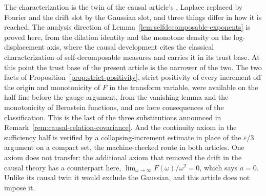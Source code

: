 \begin{remark}\label{rem:causal-relation-characterization}
The characterization is the twin of the causal article's ,
Laplace replaced by Fourier and the drift slot by the Gaussian slot, and three things differ
in how it is reached. The analysis direction of
Lemma~\ref{lem:selfdecomposable-exponents} is proved here, from the dilation identity and the
monotone density on the log-displacement axis, where the causal development cites the
classical characterization of self-decomposable \Levy{} measures and carries it in its trust
base. At this point the trust base of the present article is the narrower of the two. The two
facts of Proposition~\ref{prop:strict-positivity}, strict positivity of every increment off
the origin and monotonicity of $F$ in the transform variable, were available on the half-line
before the gauge argument, from the vanishing lemma and the monotonicity of Bernstein
functions, and are here consequences of the classification. This is the last of the three
substitutions announced in Remark~\ref{rem:causal-relation-covariance}. And the continuity
axiom in the sufficiency half is verified by a collapsing-increment estimate in place of the
$\varepsilon/3$ argument on a compact set, the machine-checked route in both articles. One
axiom does not transfer: the additional axiom that removed the drift in the causal theory has
a counterpart here, $\lim_{\omega \to \infty} F(\omega)/\omega^2 = 0$, which says $a = 0$.
Unlike its causal twin it would exclude the Gaussian, and this article
does not impose it.
\end{remark}
